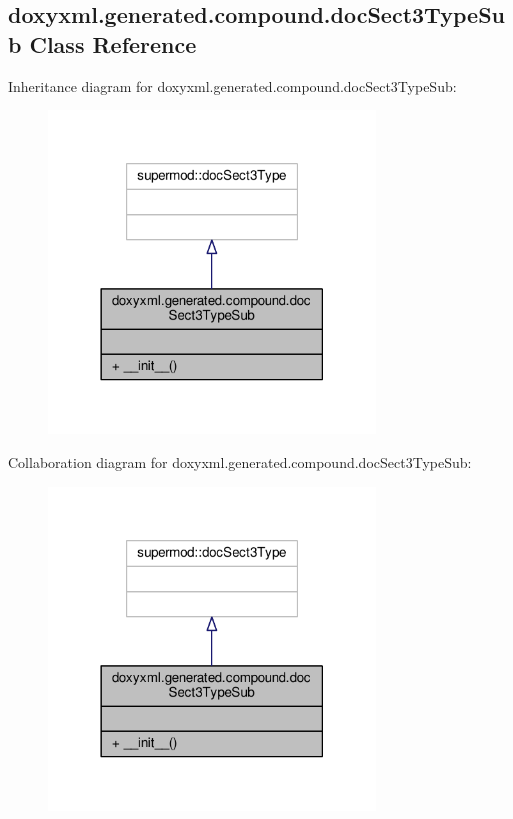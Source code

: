 \subsection{doxyxml.\+generated.\+compound.\+doc\+Sect3\+Type\+Sub Class Reference}
\label{classdoxyxml_1_1generated_1_1compound_1_1docSect3TypeSub}


Inheritance diagram for doxyxml.\+generated.\+compound.\+doc\+Sect3\+Type\+Sub\+:
\nopagebreak
\begin{figure}[H]
\begin{center}
\leavevmode
\includegraphics[width=246pt]{d9/ded/classdoxyxml_1_1generated_1_1compound_1_1docSect3TypeSub__inherit__graph}
\end{center}
\end{figure}


Collaboration diagram for doxyxml.\+generated.\+compound.\+doc\+Sect3\+Type\+Sub\+:
\nopagebreak
\begin{figure}[H]
\begin{center}
\leavevmode
\includegraphics[width=246pt]{d9/d55/classdoxyxml_1_1generated_1_1compound_1_1docSect3TypeSub__coll__graph}
\end{center}
\end{figure}
